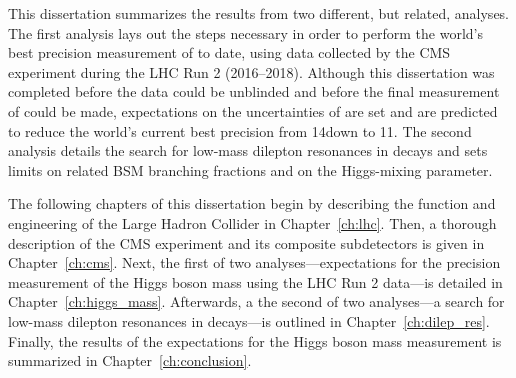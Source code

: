 This dissertation summarizes the results from two different, but related, analyses.
The first analysis lays out the steps necessary in order to perform the world's best precision measurement of \mH to date, using data collected by the CMS experiment during the LHC Run 2 (2016--2018).
Although this dissertation was completed before the data could be unblinded and before the final measurement of \mH could be made,
expectations on the uncertainties of \mH are set and are predicted to reduce the world's current best precision from 14\MeV down to 11\MeV.
The second analysis details the search for low-mass dilepton resonances in \htofourl decays and sets limits on related BSM branching fractions and on the Higgs-mixing parameter.

The following chapters of this dissertation begin by describing the function and engineering of the Large Hadron Collider in Chapter~\ref{ch:lhc}.
Then, a thorough description of the CMS experiment and its composite subdetectors is given in Chapter~\ref{ch:cms}.
Next, the first of two analyses---expectations for the precision measurement of the Higgs boson mass using the LHC Run 2 data---is detailed in Chapter~\ref{ch:higgs_mass}.
Afterwards, a the second of two analyses---a search for low-mass dilepton resonances in \htofourl decays---is outlined in Chapter~\ref{ch:dilep_res}.
Finally, the results of the expectations for the Higgs boson mass measurement is summarized in Chapter~\ref{ch:conclusion}.









